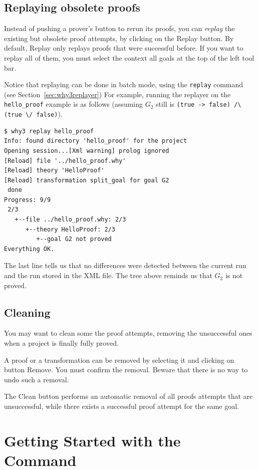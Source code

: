 \subsection{Replaying obsolete proofs}

Instead of pushing a prover's button to rerun its proofs, you can
\emph{replay} the existing but obsolete
proof attempts, by clicking on
the \textsf{Replay} button. By default, \textsf{Replay} only replays
proofs that were successful before. If you want to replay all of them,
you must select the context \textsf{all goals} at the top of the left
tool bar.

Notice that replaying can be done in batch mode, using the
\texttt{replay} command (see Section~\ref{sec:why3replayer}) For
example, running the replayer on the \texttt{hello\_proof} example is
as follows (assuming $G_2$ still is
\lstinline|(true -> false) /\ (true \/ false)|).
\begin{verbatim}
$ why3 replay hello_proof
Info: found directory 'hello_proof' for the project
Opening session...[Xml warning] prolog ignored
[Reload] file '../hello_proof.why'
[Reload] theory 'HelloProof'
[Reload] transformation split_goal for goal G2
 done
Progress: 9/9
 2/3
   +--file ../hello_proof.why: 2/3
      +--theory HelloProof: 2/3
         +--goal G2 not proved
Everything OK.
\end{verbatim}
The last line tells us that no differences were detected between the
current run and the run stored in the XML file. The tree above
reminds us that $G_2$ is not proved.

\subsection{Cleaning}

You may want to clean some the proof attempts, \eg removing the
unsuccessful ones when a project is finally fully proved.

A proof or a transformation can be removed by selecting it and
clicking on button \textsf{Remove}. You must confirm the
removal. Beware that there is no way to undo such a removal.

The \textsf{Clean} button performs an automatic removal of all proofs
attempts that are unsuccessful, while there exists a successful proof
attempt for the same goal.

\section{Getting Started with the \why Command}
\label{sec:batch}

